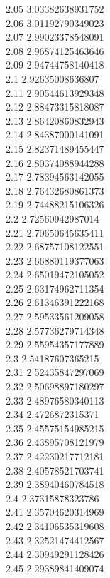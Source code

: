 {2.05	3.03382638931752\\
2.06	3.01192790349023\\
2.07	2.99023378548091\\
2.08	2.96874125463646\\
2.09	2.94744758140418\\
2.1	2.92635008636807\\
2.11	2.90544613929348\\
2.12	2.88473315818087\\
2.13	2.86420860832943\\
2.14	2.84387000141091\\
2.15	2.82371489455447\\
2.16	2.80374088944288\\
2.17	2.78394563142055\\
2.18	2.76432680861373\\
2.19	2.74488215106326\\
2.2	2.72560942987014\\
2.21	2.70650645635411\\
2.22	2.68757108122551\\
2.23	2.66880119377063\\
2.24	2.65019472105052\\
2.25	2.63174962711354\\
2.26	2.61346391222168\\
2.27	2.59533561209058\\
2.28	2.57736279714348\\
2.29	2.55954357177889\\
2.3	2.54187607365215\\
2.31	2.52435847297069\\
2.32	2.50698897180297\\
2.33	2.48976580340113\\
2.34	2.4726872315371\\
2.35	2.45575154985215\\
2.36	2.43895708121979\\
2.37	2.42230217712181\\
2.38	2.40578521703741\\
2.39	2.38940460784518\\
2.4	2.37315878323786\\
2.41	2.35704620314969\\
2.42	2.34106535319608\\
2.43	2.32521474412567\\
2.44	2.30949291128426\\
2.45	2.29389841409074\\
}
